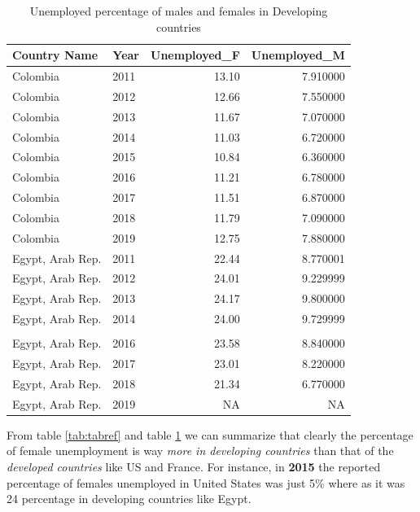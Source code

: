 \documentclass[11pt,a4paper,]{article}
\begin{document}
\begin{table}[H]

\caption{\label{tab:tabref1}Unemployed percentage of males and females in Developing countries}
\centering
\begin{tabular}[t]{l|l|r|r}
\hline
Country Name & Year & Unemployed\_F & Unemployed\_M\\
\hline
Colombia & 2011 & 13.10 & 7.910000\\
\hline
Colombia & 2012 & 12.66 & 7.550000\\
\hline
Colombia & 2013 & 11.67 & 7.070000\\
\hline
Colombia & 2014 & 11.03 & 6.720000\\
\hline
Colombia & 2015 & 10.84 & 6.360000\\
\hline
Colombia & 2016 & 11.21 & 6.780000\\
\hline
Colombia & 2017 & 11.51 & 6.870000\\
\hline
Colombia & 2018 & 11.79 & 7.090000\\
\hline
Colombia & 2019 & 12.75 & 7.880000\\
\hline
Egypt, Arab Rep. & 2011 & 22.44 & 8.770001\\
\hline
Egypt, Arab Rep. & 2012 & 24.01 & 9.229999\\
\hline
Egypt, Arab Rep. & 2013 & 24.17 & 9.800000\\
\hline
Egypt, Arab Rep. & 2014 & 24.00 & 9.729999\\
\hline
\cellcolor{red}{\textcolor{white}{\textbf{Egypt, Arab Rep.}}} & \cellcolor{red}{\textcolor{white}{\textbf{2015}}} & \cellcolor{red}{\textcolor{white}{\textbf{24.81}}} & \cellcolor{red}{\textcolor{white}{\textbf{9.390000}}}\\
\hline
Egypt, Arab Rep. & 2016 & 23.58 & 8.840000\\
\hline
Egypt, Arab Rep. & 2017 & 23.01 & 8.220000\\
\hline
Egypt, Arab Rep. & 2018 & 21.34 & 6.770000\\
\hline
Egypt, Arab Rep. & 2019 & NA & NA\\
\hline
\end{tabular}
\end{table}

From table \ref{tab:tabref} and table \ref{tab:tabref1} we can summarize that clearly the percentage of female unemployment is way \emph{more in developing countries} than that of the \emph{developed countries} like US and France. For instance, in \textbf{2015} the reported percentage of females unemployed in United States was just 5\% where as it was 24 percentage in developing countries like Egypt.
\end{document}
